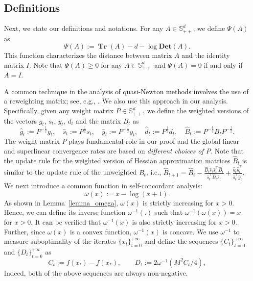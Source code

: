 \documentclass[11pt,letterpaper]{article}
\newcommand{\Det}{\mathbf{Det}}
\newcommand\0{{\Vector{0}}}
\newcommand\1{{\Vector{1}}}
\DeclareMathOperator{\Tr}{\mathbf{Tr}}
\numberwithin{assumption}{section}
\numberwithin{definition}{section}
\numberwithin{theorem}{section}
\numberwithin{remark}{section}
\begin{document}
\subsection{Definitions}\label{sec:intermediate}

Next, we state our definitions and notations. For any $A \in \mathbb{S}^d_{++}$, we define  $\Psi(A)$ as
\begin{equation}\label{potential_function}
    \Psi(A) := \Tr(A) - d - \log{\Det(A)}.
\end{equation}
This function characterizes the distance between matrix $A$ and the identity matrix $I$. Note that $\Psi(A) \geq 0$ for any $A \in \mathbb{S}^d_{++}$ and $\Psi(A) = 0$ if and only if $A = I$.

A common technique in the analysis of quasi-Newton methods involves the use of a reweighting matrix; see, e.g.,  \cite{QN_tool}. We also use this approach in our analysis. Specifically, given any weight matrix $P \in \mathbb{S}^d_{++}$, we define the weighted versions of the vectors $g_t$, $s_t$, $y_t$, $d_t$ and the matrix $B_t$ as 
\begin{equation}\label{weighted_vector}
\hat{g}_t\! := \!P^{-\frac{1}{2}}g_t,\quad  
\hat{s}_t \!:= \! P^{\frac{1}{2}} s_t, \quad 
\hat{y}_t \! := \! P^{-\frac{1}{2}}y_t,\quad  
\hat{d}_t \! := \! P^{\frac{1}{2}} d_t,\quad 
\hat{B}_t := P^{-\frac{1}{2}}B_t P^{-\frac{1}{2}}.
\end{equation}
The weight matrix $P$ plays fundamental role in our proof and the global linear and superlinear convergence rates are based on \textit{different choices of $P$}. Note that the update rule for the weighted version of Hessian approximation matrices $\hat{B}_t$ is similar to the update rule of the unweighted $B_t$, i.e., $\hat{B}_{t+ 1} = \hat{B}_t - \frac{\hat{B}_t \hat{s}_t \hat{s}_t^\top \hat{B}_t}{\hat{s}_t^\top \hat{B}_t \hat{s}_t} + \frac{\hat{y}_t \hat{y}_t^\top}{\hat{s}_t^\top \hat{y}_t}$. We next introduce a common function in self-concordant analysis:
\begin{equation}\label{definition_omega}
    \omega(x) := x - \log{(x + 1)}.
\end{equation}
As shown in Lemma~\ref{lemma_omega}, $\omega(x)$ is strictly increasing for $x > 0$. Hence, we can define its inverse function $\omega^{-1}(.)$  such that $\omega^{-1}(\omega(x)) = x$  for $x > 0$. It can be verified that \(\omega^{-1}(x)\) is also strictly increasing for \(x > 0\). Further, since \(\omega(x)\) is a convex function, \(\omega^{-1}(x)\) is concave. We use $\omega^{-1}$ to measure suboptimality of the iterates $\{x_t\}_{t = 0}^{+\infty}$ and define the sequences $\{C_t\}_{t = 0}^{+\infty}$ and $\{D_t\}_{t = 0}^{+\infty}$ as
\begin{equation}\label{suboptimality}
    C_t := f(x_t) - f(x_*),\qquad 
    D_t := 2\omega^{-1}\left({M^2}C_t/4\right),
\end{equation} 
Indeed, both of the above sequences are always non-negative. 
\end{document}
